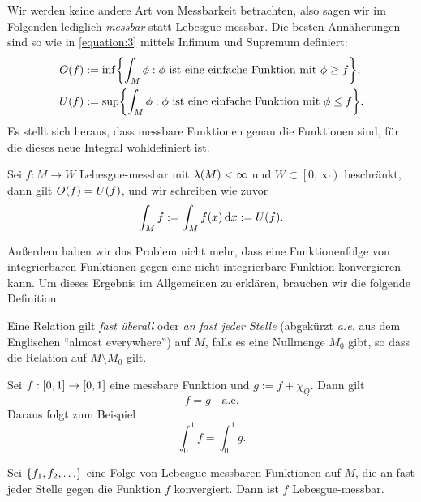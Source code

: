 Wir werden keine andere Art von Messbarkeit betrachten, also sagen wir im Folgenden lediglich \emph{messbar} statt Lebesgue-messbar.
Die besten Annäherungen sind so wie in \eqref{equation:3} mittels Infimum und Supremum definiert:
\begin{align}
	O\parentheses*{f} &:= \inf\braces*{\int_M \phi : \phi\text{ ist eine einfache Funktion mit }\phi \ge f},\\
	U\parentheses*{f} &:= \sup\braces*{\int_M \phi : \phi\text{ ist eine einfache Funktion mit }\phi \le f}.
\end{align}
Es stellt sich heraus, dass messbare Funktionen genau die Funktionen sind, für die dieses neue Integral wohldefiniert ist.

\begin{proposition}
	Sei \(f: M \to W\) Lebesgue-messbar mit \(\lambda\parentheses*{M} < \infty\) und \(W \subset \left[0, \infty\right)\) beschränkt, dann gilt \(O\parentheses*{f} = U\parentheses*{f}\), und wir schreiben wie zuvor
	\[
		\int_M f := \int_M f\parentheses*{x}\d x := U\parentheses*{f}.
	\]
\end{proposition}

Außerdem haben wir das Problem nicht mehr, dass eine Funktionenfolge von integrierbaren Funktionen gegen eine nicht integrierbare Funktion konvergieren kann.
Um dieses Ergebnis im Allgemeinen zu erklären, brauchen wir die folgende Definition.

\begin{definition}
	Eine Relation gilt \emph{fast überall} oder \emph{an fast jeder Stelle} (abgekürzt \emph{a.e.} aus dem Englischen ``almost everywhere'') auf \(M\), falls es eine Nullmenge \(M_0\) gibt, so dass die Relation auf \(M \setminus M_0\) gilt.
\end{definition}

\begin{example}
	Sei \(f: \brackets*{0, 1} \to \brackets*{0, 1}\) eine messbare Funktion und \(g := f + \chi_Q\).
	Dann gilt
	\[
		f = g \quad \text{a.e.}
	\]
	Daraus folgt zum Beispiel
	\[
		\int_0^1 f = \int_0^1 g.
	\]
\end{example}

\begin{proposition}\label{proposition:12}
	Sei \(\braces*{f_1, f_2, \ldots}\) eine Folge von Lebesgue-messbaren Funktionen auf \(M\), die an fast jeder Stelle gegen die Funktion \(f\) konvergiert.
	Dann ist \(f\) Lebesgue-messbar.
\end{proposition}

